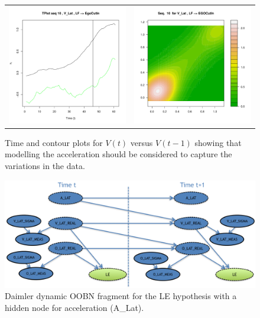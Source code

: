 \begin{figure}[ht!]
  \centering
  \setlength{\tabcolsep}{0.05pt}
  \renewcommand{\arraystretch}{0.02}
    \begin{tabular}{cc}
    \includegraphics[width=60mm]{figures/DaimlerLE_EGO_L_LE_OBJ_R_EGOCutInVel.pdf}&
    \includegraphics[width=60mm]{figures/DaimlerBivariate_temporal_analysisEGO_LVel.pdf}\\
  \end{tabular}
      \caption{ \label{Figure:daimlerVel}Time and contour plots for $V(t)$ versus $V(t-1)$ showing that modelling the acceleration should be considered to capture the variations in the data.}
\end{figure}

\begin{figure}[ht!]
\begin{center}
\includegraphics[scale=0.48]{./figures/DaimlertempDynAccel}
\end{center}
\caption{\label{Figure:tempDynAccel}Daimler dynamic OOBN fragment for the LE hypothesis with a hidden node for acceleration (A\_Lat).}
\end{figure}